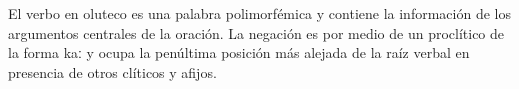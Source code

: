El verbo en oluteco es una palabra polimorfémica \textcolor{MidnightBlue}{\citep{Oluteco}} y contiene la información de los argumentos centrales de la oración. La negación es por medio de un proclítico de la forma {\setmainfont{Doulos SIL} kaː} y ocupa la penúltima posición más alejada de la raíz verbal en presencia de otros clíticos y afijos.
